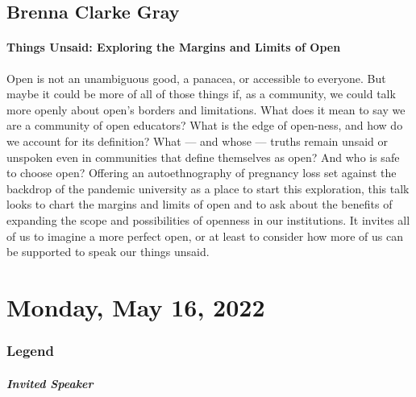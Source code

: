 \documentclass[
]{book}
\begin{document}
\hypertarget{brenna-clarke-gray}{%
\section*{Brenna Clarke Gray}\label{brenna-clarke-gray}}

\begin{reflect}
\hypertarget{things-unsaid-exploring-the-margins-and-limits-of-open}{%
\subsubsection{Things Unsaid: Exploring the Margins and Limits of
Open}\label{things-unsaid-exploring-the-margins-and-limits-of-open}}

Open is not an unambiguous good, a panacea, or accessible to everyone.
But maybe it could be more of all of those things if, as a community, we
could talk more openly about open's borders and limitations. What does
it mean to say we are a community of open educators? What is the edge of
open-ness, and how do we account for its definition? What --- and whose
--- truths remain unsaid or unspoken even in communities that define
themselves as open? And who is safe to choose open? Offering an
autoethnography of pregnancy loss set against the backdrop of the
pandemic university as a place to start this exploration, this talk
looks to chart the margins and limits of open and to ask about the
benefits of expanding the scope and possibilities of openness in our
institutions. It invites all of us to imagine a more perfect open, or at
least to consider how more of us can be supported to speak our things
unsaid.
\end{reflect}

\hypertarget{monday-may-16-2022}{%
\chapter{Monday, May 16, 2022}\label{monday-may-16-2022}}

\hypertarget{legend}{%
\subsection*{Legend}\label{legend}}

\begin{wp}
\hypertarget{invited-speaker}{%
\paragraph{Invited Speaker}\label{invited-speaker}}
\end{wp}
\end{document}
